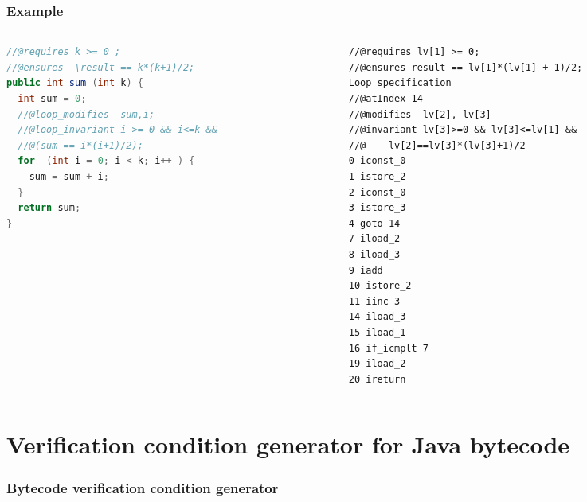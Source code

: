\documentclass{beamer}
\begin{document}
%      


\begin{frame}\frametitle{Example}
\begin{columns}
\begin{column}{5.1cm}
{\tiny
\begin{lstlisting}[language=java]
//@requires k >= 0 ;
//@ensures  \result == k*(k+1)/2;
public int sum (int k) {
  int sum = 0;		
  //@loop_modifies  sum,i;
  //@loop_invariant i >= 0 && i<=k && 
  //@(sum == i*(i+1)/2);
  for  (int i = 0; i < k; i++ ) {
    sum = sum + i;
  } 	
  return sum;
}
\end{lstlisting}}
\end{column}

\begin{column}{5.1cm}
{\tiny
\begin{lstlisting}[language=jvmis]
//@requires lv[1] >= 0;
//@ensures result == lv[1]*(lv[1] + 1)/2;
Loop specification
//@atIndex 14 
//@modifies  lv[2], lv[3]
//@invariant lv[3]>=0 && lv[3]<=lv[1] &&
//@    lv[2]==lv[3]*(lv[3]+1)/2
0 iconst_0
1 istore_2
2 iconst_0
3 istore_3
4 goto 14 
7 iload_2
8 iload_3
9 iadd
10 istore_2 
11 iinc 3 
14 iload_3
15 iload_1
16 if_icmplt 7 
19 iload_2
20 ireturn
\end{lstlisting}}
\end{column}
\end{columns}
\end{frame}

\section{Verification condition generator for Java bytecode}
\begin{frame}[shrink]\frametitle{Bytecode verification condition generator}
\begin{center}

\end{center}
\end{frame} 
\end{document}
